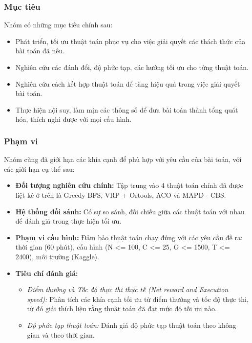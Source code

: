 \documentclass[conference]{IEEEtran}
\begin{document}
\subsubsection{Mục tiêu}
Nhóm có những mục tiêu chính sau:

\begin{itemize}
    \item Phát triển, tối ưu thuật toán phục vụ cho việc giải quyết các thách thức của bài toán đã nêu.
    \item Nghiên cứu các đánh đổi, độ phức tạp, các hướng tối ưu cho từng thuật toán.
    \item Nghiên cứu cách kết hợp thuật toán để tăng hiệu quả trong việc giải quyết bài toán.
    \item Thực hiện nội suy, làm mịn các thông số để đưa bài toán thành tổng quát hóa, thích nghi được với mọi cấu hình.
\end{itemize}

\subsubsection{Phạm vi}
Nhóm cũng đã giới hạn các khía cạnh để phù hợp với yêu cầu của bài toán, với các giới hạn cụ thể sau:

\begin{itemize}
    \item \textbf{Đối tượng nghiên cứu chính:} Tập trung vào 4 thuật toán chính đã được liệt kê ở trên là Greedy BFS, VRP + Ortools, ACO và MAPD - CBS.
    \item \textbf{Hệ thống đối sánh:} Có sự so sánh, đối chiếu giữa các thuật toán với nhau để đánh giá trong thực hiện tối ưu. 
    \item \textbf{Phạm vi cấu hình:} Đảm bảo thuật toán chạy đúng với các yêu cầu đề ra: thời gian (60 phút), cấu hình (N <= 100, C <= 25, G <= 1500, T <= 2400), môi trường (Kaggle).
    \item \textbf{Tiêu chí đánh giá:}
        \begin{itemize}
        \item \textit{Điểm thưởng và Tốc độ thực thi thực tế (Net reward and Execution speed):} Phân tích các khía cạnh tối ưu từ điểm thưởng và tốc độ thực thi, từ đó giải thích liệu rằng thuật toán đã đạt mức độ tối ưu nào.
        \item \textit{Độ phức tạp thuật toán:} Đánh giá độ phức tạp thuật toán theo không gian và theo thời gian.
        \end{itemize}

\end{itemize}
\end{document}
